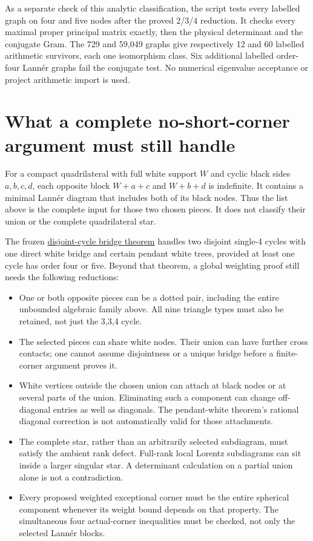 \documentclass[
  10pt,
]{report}
\providecommand{\tightlist}{%
  \setlength{\itemsep}{0pt}\setlength{\parskip}{0pt}}
\begin{document}
As a separate check of this analytic classification, the script tests
every labelled graph on four and five nodes after the proved 2/3/4
reduction. It checks every maximal proper principal matrix exactly, then
the physical determinant and the conjugate Gram. The 729 and 59,049
graphs give respectively 12 and 60 labelled arithmetic survivors, each
one isomorphism class. Six additional labelled order-four Lannér graphs
fail the conjugate test. No numerical eigenvalue acceptance or project
arithmetic import is used.

\section{What a complete no-short-corner argument must still
handle}\label{what-a-complete-no-short-corner-argument-must-still-handle}

For a compact quadrilateral with full white support \(W\) and cyclic
black sides \(a,b,c,d\), each opposite block \(W+a+c\) and \(W+b+d\) is
indefinite. It contains a minimal Lannér diagram that includes both of
its black nodes. Thus the list above is the complete input for those two
chosen pieces. It does not classify their union or the complete
quadrilateral star.

The frozen
\href{fresh_arithmetic_sqrt2_quad_rank_20261015.md}{disjoint-cycle
bridge theorem} handles two disjoint single-4 cycles with one direct
white bridge and certain pendant white trees, provided at least one
cycle has order four or five. Beyond that theorem, a global weighting
proof still needs the following reductions:

\begin{itemize}
\tightlist
\item
  One or both opposite pieces can be a dotted pair, including the entire
  unbounded algebraic family above. All nine triangle types must also be
  retained, not just the 3,3,4 cycle.
\item
  The selected pieces can share white nodes. Their union can have
  further cross contacts; one cannot assume disjointness or a unique
  bridge before a finite-corner argument proves it.
\item
  White vertices outside the chosen union can attach at black nodes or
  at several parts of the union. Eliminating such a component can change
  off-diagonal entries as well as diagonals. The pendant-white theorem's
  rational diagonal correction is not automatically valid for those
  attachments.
\item
  The complete star, rather than an arbitrarily selected subdiagram,
  must satisfy the ambient rank defect. Full-rank local Lorentz
  subdiagrams can sit inside a larger singular star. A determinant
  calculation on a partial union alone is not a contradiction.
\item
  Every proposed weighted exceptional corner must be the entire
  spherical component whenever its weight bound depends on that
  property. The simultaneous four actual-corner inequalities must be
  checked, not only the selected Lannér blocks.
\end{itemize}
\end{document}
